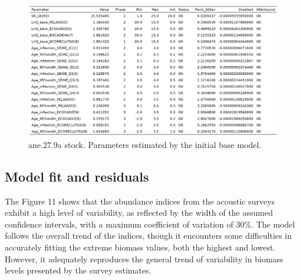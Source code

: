 \documentclass[
]{article}
\begin{document}
\begin{figure}[H]

{\centering \includegraphics[width=0.95\linewidth]{report/run/S1.0_4FLEETS/tb_params_est} 

}

\caption{ane.27.9a stock. Parameters estimated by the initial base model.}\label{fig:unnamed-chunk-13}
\end{figure}

\hypertarget{model-fit-and-residuals}{%
\subsection{Model fit and residuals}\label{model-fit-and-residuals}}

The Figure 11 shows that the abundance indices from the acoustic surveys
exhibit a high level of variability, as reflected by the width of the
assumed confidence intervals, with a maximum coefficient of variation of
30\%. The model follows the overall trend of the indices, though it
encounters some difficulties in accurately fitting the extreme biomass
values, both the highest and lowest. However, it adequately reproduces
the general trend of variability in biomass levels presented by the
survey estimates.
\end{document}
